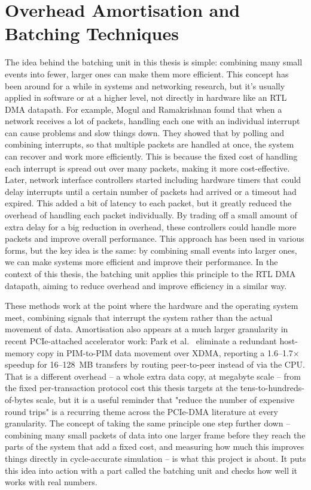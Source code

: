 
\section{Overhead Amortisation and Batching Techniques}
\label{sec:ch2_batching}

The idea behind the batching unit in this thesis is simple: combining many small events into fewer, larger ones can make them more efficient. This concept has been around for a while in systems and networking research, but it's usually applied in software or at a higher level, not directly in hardware like an RTL DMA datapath. For example, Mogul and Ramakrishnan found that when a network receives a lot of packets, handling each one with an individual interrupt can cause problems and slow things down. They showed that by polling and combining interrupts, so that multiple packets are handled at once, the system can recover and work more efficiently. This is because the fixed cost of handling each interrupt is spread out over many packets, making it more cost-effective. Later, network interface controllers started including hardware timers that could delay interrupts until a certain number of packets had arrived or a timeout had expired. This added a bit of latency to each packet, but it greatly reduced the overhead of handling each packet individually. By trading off a small amount of extra delay for a big reduction in overhead, these controllers could handle more packets and improve overall performance. This approach has been used in various forms, but the key idea is the same: by combining small events into larger ones, we can make systems more efficient and improve their performance. In the context of this thesis, the batching unit applies this principle to the RTL DMA datapath, aiming to reduce overhead and improve efficiency in a similar way.

These methods work at the point where the hardware and the operating system meet, combining signals that interrupt the system rather than the actual movement of data. Amortisation also appears at a much larger granularity in recent PCIe-attached accelerator work: Park et al.~\cite{park2024low} eliminate a redundant host-memory copy in PIM-to-PIM data movement over XDMA, reporting a 1.6--1.7$\times$ speedup for 16--128~MB transfers by routing peer-to-peer instead of via the CPU. That is a different overhead -- a whole extra data copy, at megabyte scale -- from the fixed per-transaction protocol cost this thesis targets at the tens-to-hundreds-of-bytes scale, but it is a useful reminder that "reduce the number of expensive round trips" is a recurring theme across the PCIe-DMA literature at every granularity. The concept of taking the same principle one step further down -- combining many small packets of data into one larger frame before they reach the parts of the system that add a fixed cost, and measuring how much this improves things directly in cycle-accurate simulation -- is what this project is about. It puts this idea into action with a part called the batching unit and checks how well it works with real numbers.

